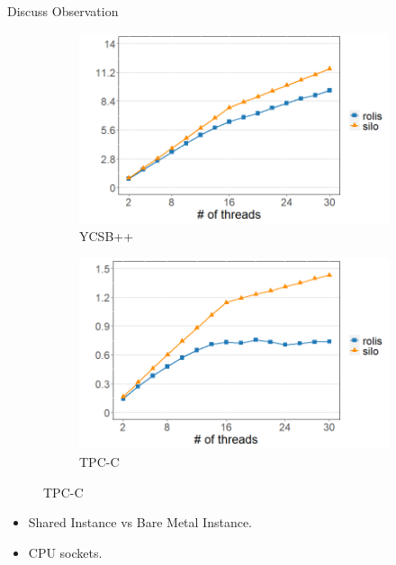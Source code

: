\documentclass[xcolor=dvipsnames]{beamer}
\begin{document}
    \begin{frame}{Discuss Observation}

        \begin{figure}
            \begin{subfigure}[h]{0.5\textwidth}
                \includegraphics[scale=0.30]{fig10_ycsb.png}
                \caption{YCSB++}
            \end{subfigure}%
            \hfill
            \begin{subfigure}[h]{0.5\textwidth}
                \includegraphics[scale=0.30]{fig10_tpcc.png}
                \caption{TPC-C}
            \end{subfigure}
        \end{figure}

        \begin{itemize}
            \item Shared Instance vs Bare Metal Instance. 
            \item CPU sockets.
        \end{itemize}

    \end{frame}
\end{document}
